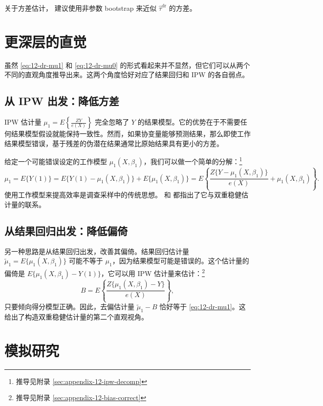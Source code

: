 关于方差估计，\cite{Funk:2011} 建议使用非参数 bootstrap 来近似 $\hat\tau^{\mathrm{dr}}$ 的方差。

\section{更深层的直觉}\label{sec:12-intuition}

虽然 \cref{eq:12-dr-mu1} 和 \cref{eq:12-dr-mu0} 的形式看起来并不显然，但它们可以从两个不同的直观角度推导出来。这两个角度恰好对应了结果回归和 IPW 的各自弱点。

\subsection{从 IPW 出发：降低方差}\label{sec:12-ipw-to-dr}

IPW 估计量 $\mu_1 = E\left\{\frac{ZY}{e(X)}\right\}$ 完全忽略了 $Y$ 的结果模型。它的优势在于不需要任何结果模型假设就能保持一致性。然而，如果协变量能够预测结果，那么即使工作结果模型错误，基于残差的伪潜在结果通常比原始结果具有更小的方差。

给定一个可能错误设定的工作模型 $\mu_1(X, \beta_1)$，我们可以做一个简单的分解：\footnote{推导见附录 \cref{sec:appendix-12-ipw-decomp}}
\[
\mu_1 = E\{Y(1)\} = E\{Y(1) - \mu_1(X, \beta_1)\} + E\{\mu_1(X, \beta_1)\} = E\left\{\frac{Z\{Y - \mu_1(X, \beta_1)\}}{e(X)} + \mu_1(X, \beta_1)\right\}.
\]
使用工作模型来提高效率是调查采样中的传统思想。\cite{LittleAn:2004} 和 \cite{Lumley:2011} 都指出了它与双重稳健估计量的联系。

\subsection{从结果回归出发：降低偏倚}\label{sec:12-reg-to-dr}

另一种思路是从结果回归出发，改善其偏倚。结果回归估计量 $\tilde\mu_1 = E\{\mu_1(X, \beta_1)\}$ 可能不等于 $\mu_1$，因为结果模型可能是错误的。这个估计量的偏倚是 $E\{\mu_1(X,\beta_1) - Y(1)\}$，它可以用 IPW 估计量来估计：\footnote{推导见附录 \cref{sec:appendix-12-bias-correct}}
\[
B = E\left\{\frac{Z\{\mu_1(X, \beta_1) - Y\}}{e(X)}\right\},
\]
只要倾向得分模型正确。因此，去偏估计量 $\tilde\mu_1 - B$ 恰好等于 \cref{eq:12-dr-mu1}。这给出了构造双重稳健估计量的第二个直观视角。

\section{模拟研究}\label{sec:12-simulation}

